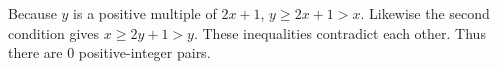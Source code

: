 Because $y$ is a positive multiple of $2x+1$, $y\ge2x+1>x$. Likewise the second condition gives $x\ge2y+1>y$. These inequalities contradict each other. Thus there are $\boxed0$ positive-integer pairs.
